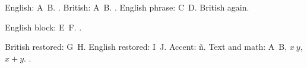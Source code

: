 \documentclass{article}
\begin{document}
English: A~B. \refname.
British: A~B. \refname.
\foreignlanguage{english}{English phrase: C~D.} British again.
\begin{otherlanguage}{english}
English block: E~F. \refname.
\end{otherlanguage}
British restored: G~H.
English restored: I~J. Accent: \~{n}.
Text and math: A~B, $x~y$, $x+y$.
\makeatletter
\protected@edef{}
\makeatother
\saved.
\end{document}
